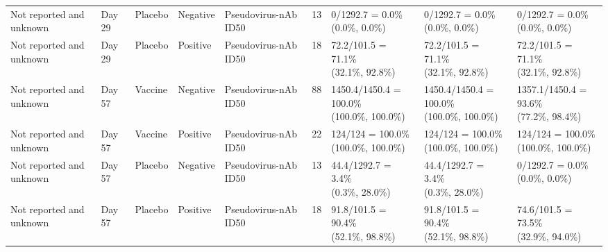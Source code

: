 \documentclass[]{book}
\theoremstyle{definition}
\theoremstyle{definition}
\theoremstyle{definition}
\newcommand{\1}{\mathbbm{1}}
\begin{document}
\begin{landscape}
\begin{ThreePartTable}
\begin{longtable}[t]{>{\raggedright\arraybackslash}p{2.7cm}llllllll}
\hspace{1em}Not reported and unknown & Day 29 & Placebo & Negative & Pseudovirus-nAb ID50 & 13 & \makecell[l]{0/1292.7 = 0.0\%\\(0.0\%, 0.0\%)} & \makecell[l]{0/1292.7 = 0.0\%\\(0.0\%, 0.0\%)} & \makecell[l]{0/1292.7 = 0.0\%\\(0.0\%, 0.0\%)}\\
\hspace{1em}Not reported and unknown & Day 29 & Placebo & Positive & Pseudovirus-nAb ID50 & 18 & \makecell[l]{72.2/101.5 = 71.1\%\\(32.1\%, 92.8\%)} & \makecell[l]{72.2/101.5 = 71.1\%\\(32.1\%, 92.8\%)} & \makecell[l]{72.2/101.5 = 71.1\%\\(32.1\%, 92.8\%)}\\
\hspace{1em}Not reported and unknown & Day 57 & Vaccine & Negative & Pseudovirus-nAb ID50 & 88 & \makecell[l]{1450.4/1450.4 = 100.0\%\\(100.0\%, 100.0\%)} & \makecell[l]{1450.4/1450.4 = 100.0\%\\(100.0\%, 100.0\%)} & \makecell[l]{1357.1/1450.4 = 93.6\%\\(77.2\%, 98.4\%)}\\
\hspace{1em}Not reported and unknown & Day 57 & Vaccine & Positive & Pseudovirus-nAb ID50 & 22 & \makecell[l]{124/124 = 100.0\%\\(100.0\%, 100.0\%)} & \makecell[l]{124/124 = 100.0\%\\(100.0\%, 100.0\%)} & \makecell[l]{124/124 = 100.0\%\\(100.0\%, 100.0\%)}\\
\hspace{1em}Not reported and unknown & Day 57 & Placebo & Negative & Pseudovirus-nAb ID50 & 13 & \makecell[l]{44.4/1292.7 = 3.4\%\\(0.3\%, 28.0\%)} & \makecell[l]{44.4/1292.7 = 3.4\%\\(0.3\%, 28.0\%)} & \makecell[l]{0/1292.7 = 0.0\%\\(0.0\%, 0.0\%)}\\
\hspace{1em}Not reported and unknown & Day 57 & Placebo & Positive & Pseudovirus-nAb ID50 & 18 & \makecell[l]{91.8/101.5 = 90.4\%\\(52.1\%, 98.8\%)} & \makecell[l]{91.8/101.5 = 90.4\%\\(52.1\%, 98.8\%)} & \makecell[l]{74.6/101.5 = 73.5\%\\(32.9\%, 94.0\%)}\\*
\end{longtable}
\end{ThreePartTable}



\end{landscape}
\end{document}
